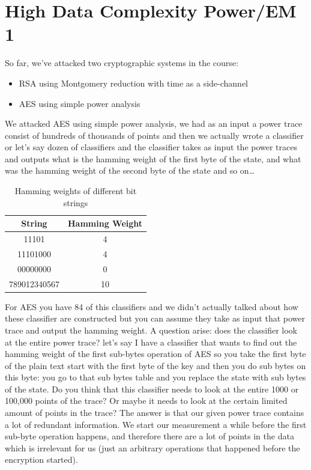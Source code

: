 \chapter{High Data Complexity Power/EM 1}\label{cha:High Data Complexity Power/EM 1}
So far, we've attacked two cryptographic systems in the course:
\begin{itemize}
\item RSA using Montgomery reduction with time as a side-channel
\item AES using simple power analysis
\end{itemize}
We attacked AES using simple power analysis, we had as an input a power trace consist of hundreds of thousands of points and then we actually wrote a classifier or let’s say dozen of classifiers and the classifier takes as input the power traces and outputs what is the hamming weight of the first byte of the state, and what was the hamming weight of the second byte of the state and so on… 
\begin{table}
\begin{center}
\begin{tabular}{ | c c | }
\hline
String & Hamming Weight \\ 
 \hline
 11101 & 4 \\ 
 \hline
 11101000 & 4 \\
 \hline
 00000000 & 0 \\
 \hline
 789012340567 & 10 \\
 \hline
\end{tabular}
\end{center}
\label{hammingWeights}
\caption{Hamming weights of different bit strings \cite{hamming}}
\end{table}

For AES you have 84 of this classifiers and we didn't actually talked about how these classifier are constructed but you can assume they take as input that power trace and output the hamming weight. 
A question arise: does the classifier look at the entire power trace? let’s say I have a classifier that wants to find out the hamming weight of the first sub-bytes operation of AES so you take the first byte of the plain text start with the first byte of the key and then you do sub bytes on this byte: you go to that sub bytes table and you replace the state with sub bytes of the state. 
Do you think that this classifier needs to look at the entire 1000 or 100,000 points of the trace? Or maybe it needs to look at the certain limited amount of points in the trace?
The answer is that our given power trace contains a lot of redundant information. We start our measurement a while before the first sub-byte operation happens, and therefore there are a lot of points in the data which is irrelevant for us (just an arbitrary operations that happened before the encryption started).

